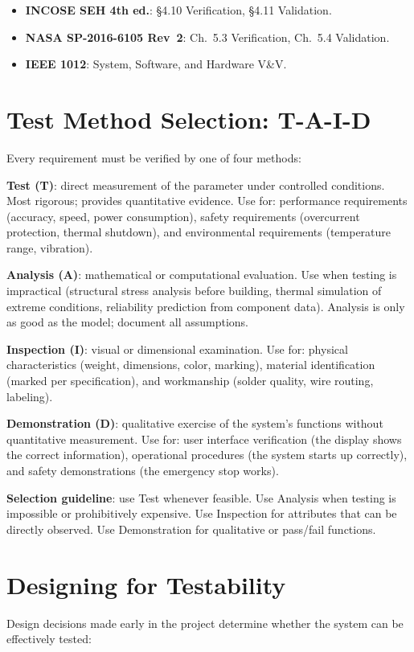 \documentclass[11pt,letterpaper,twoside,openany]{book}
\begin{document}
\begin{keyconceptbox}
\begin{itemize}[nosep,leftmargin=1.5em]
\item \textbf{INCOSE SEH 4th ed.}: \S4.10 Verification, \S4.11 Validation.
\item \textbf{NASA SP-2016-6105 Rev~2}: Ch.~5.3 Verification, Ch.~5.4 Validation.
\item \textbf{IEEE 1012}: System, Software, and Hardware V\&V.
\end{itemize}
\end{keyconceptbox}

\section{Test Method Selection: T-A-I-D}
Every requirement must be verified by one of four methods:

\textbf{Test (T)}: direct measurement of the parameter under controlled conditions. Most rigorous; provides quantitative evidence. Use for: performance requirements (accuracy, speed, power consumption), safety requirements (overcurrent protection, thermal shutdown), and environmental requirements (temperature range, vibration).

\textbf{Analysis (A)}: mathematical or computational evaluation. Use when testing is impractical (structural stress analysis before building, thermal simulation of extreme conditions, reliability prediction from component data). Analysis is only as good as the model; document all assumptions.

\textbf{Inspection (I)}: visual or dimensional examination. Use for: physical characteristics (weight, dimensions, color, marking), material identification (marked per specification), and workmanship (solder quality, wire routing, labeling).

\textbf{Demonstration (D)}: qualitative exercise of the system's functions without quantitative measurement. Use for: user interface verification (the display shows the correct information), operational procedures (the system starts up correctly), and safety demonstrations (the emergency stop works).

\textbf{Selection guideline}: use Test whenever feasible. Use Analysis when testing is impossible or prohibitively expensive. Use Inspection for attributes that can be directly observed. Use Demonstration for qualitative or pass/fail functions.

\section{Designing for Testability}
Design decisions made early in the project determine whether the system can be effectively tested:
\end{document}
